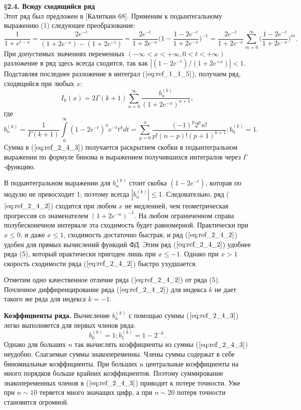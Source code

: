 \S \textbf{2.4. Всюду сходящийся ряд}
\\

Этот ряд был предложен в [Калиткин 68]. Применим к подынтегальному выражению
(1) следующее преобразование:
\begin{equation}
\frac{1}{1+e^{t-x}}=\frac{2e^{-t}}{(1+2e^{-x})-(1+2e^{-t})}=\frac{2e^{-t}}{1+2e^{-x}}\Bigg(1-\frac{1-2e^{-t}}{1+2e^{-x}}\Bigg)^{-1}=\frac{2e^{-t}}{1+2e^{-x}} \sum_{m=0}^{\infty} \Bigg(\frac{1-2e^{-t}}{1+2e^{-x}}\Bigg)^{m}.
\label{eq:ref_2_4_1}
\end{equation}
При допустимых значениях переменных $(-\infty < x < +\infty,0 < t < +\infty)$ разложение в
ряд здесь всегда сходится, так как $|(1-2e^{-t})/(1+2e^{+x})| < 1$. Подставляя
последнее разложение в интеграл ($\ref{eq:ref_1_1_5}$), получаем ряд, сходящийся при любых $x$:
\begin{equation}
I_k(x)=2\Gamma(k+1)\sum_{n=0}^{\infty} \frac{b_n^{(k)}}{(1+2e^{-x})^{n+1}},
\label{eq:ref_2_4_2}
\end{equation}
где
\begin{equation}
b_n^{(k)}=\frac{1}{\Gamma(k+1)}\int\limits_0^{\infty} (1-2e^{-t})^ne^{-t}t^kdt=\sum\limits_{p=0}^n \frac{(-1)^p 2^p n!}{p!(n-p)!(p+1)^{k+1}};b_0^{(k)}=1.
\label{eq:ref_2_4_3}
\end{equation}
Сумма в ($\ref{eq:ref_2_4_3}$) получается раскрытием скобки в подынтегральном выражении по
формуле бинома и выражением получившихся интегралов через $\Gamma$ -функцию.

В подынтегральном выражении для $b_n^{(k)}$ стоит скобка $(1-2e^{-t})$, которая по
модулю не превосходит 1; поэтому всегда $|b_n^{(k)}| \leqslant 1$.
Следовательно, ряд ($\ref{eq:ref_2_4_2}$) сходится при любом $x$ не медленней, чем геометрическая прогрессия со
знаменателем $(1+2e^{-x})^{-1}$. На любом ограниченном справа полубесконечном
интервале эта сходимость будет равномерной. Практически при $x \leqslant 0$, и даже
$x \leqslant 1$, сходимость достаточно быстрая, и ряд ($\ref{eq:ref_2_4_2}$) удобен для прямых вычислений
функций ФД. Этим ряд ($\ref{eq:ref_2_4_2}$) удобнее ряда (5), который практически пригоден
лишь при $x \leqslant -1$. Однако при $x > 1$ скорость сходимости ряда ($\ref{eq:ref_2_4_2}$) быстро
ухудшается.

Отметим одно качественное отличие ряда ($\ref{eq:ref_2_4_2}$) от ряда (5). Почленное
диффиренцирование ряда ($\ref{eq:ref_2_4_2}$) для индекса $k$ не дает такого же ряда для индекса
$k=-1$.

\textbf{Коэффициенты ряда.} Вычисление $b_n^{(k)}$ с помощью суммы ($\ref{eq:ref_2_4_3}$) легко
выполняется для первых членов ряда:
\begin{equation}
b_0^{(k)}=1;b_1^{(k)}=1-2^{-k}.
\label{eq:ref_2_4_4}
\end{equation}
Однако для больших $n$ так вычислять коэффициенты из суммы ($\ref{eq:ref_2_4_3}$) неудобно.
Слагаемые суммы знакопеременны. Члены суммы содержат в себе
биномиальные коэффициенты. При больших n центральные коэффициенты на
много порядков больше крайних коэффициентов. Поэтому суммирование
знакопеременных членов в ($\ref{eq:ref_2_4_3}$) приводит к потере точности. Уже при $n \sim 10$
теряется много значащих цифр, а при $n \sim 20$ потеря точности становится
огромной.

